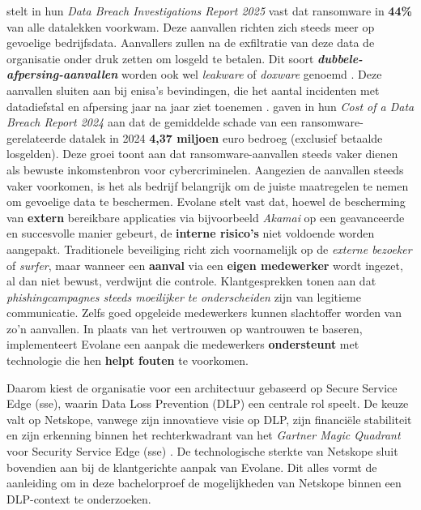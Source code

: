 \textcite{VerizonBusiness2025} stelt in hun \textit{Data Breach Investigations Report 2025} vast dat ransomware in \textbf{44\%} van alle datalekken voorkwam. 
Deze aanvallen richten zich steeds meer op gevoelige bedrijfsdata. 
Aanvallers zullen na de exfiltratie van deze data de organisatie onder druk zetten om losgeld te betalen.
Dit soort \textit\textbf{{dubbele-afpersing}-aanvallen} worden ook wel \textit{leakware} of \textit{doxware} genoemd \autocite{IBM2024}. 
Deze aanvallen sluiten aan bij \gls{enisa}'s bevindingen, die het aantal incidenten met datadiefstal en afpersing jaar na jaar ziet toenemen \autocite{EUAC2022,EUAC2023}.
\textcite{IBMSecurity2024} gaven in hun \textit{Cost of a Data Breach Report 2024} aan dat de gemiddelde schade van een ransomware-gerelateerde datalek in 2024 \textbf{4,37 miljoen} euro bedroeg (exclusief betaalde losgelden).
Deze groei toont aan dat ransomware-aanvallen steeds vaker dienen als bewuste inkomstenbron voor cybercriminelen.
Aangezien de aanvallen steeds vaker voorkomen, is het als bedrijf belangrijk om de juiste maatregelen te nemen om gevoelige data te beschermen. 
Evolane stelt vast dat, hoewel de bescherming van \textbf{extern} bereikbare applicaties via bijvoorbeeld \textit{Akamai} op een geavanceerde en succesvolle manier gebeurt,
de \textbf{interne risico's} niet voldoende worden aangepakt.
Traditionele beveiliging richt zich voornamelijk op de \textit{externe bezoeker} of \textit{surfer}, maar wanneer een \textbf{aanval} via een \textbf{eigen medewerker} wordt ingezet, al dan niet bewust, verdwijnt die controle.
Klantgesprekken tonen aan dat \textit{phishingcampagnes steeds moeilijker te onderscheiden} zijn van legitieme communicatie. 
Zelfs goed opgeleide medewerkers kunnen slachtoffer worden van zo'n aanvallen.
In plaats van het vertrouwen op wantrouwen te baseren,  implementeert Evolane een aanpak die medewerkers \textbf{ondersteunt} met technologie die hen \textbf{helpt fouten} te voorkomen. 

Daarom kiest de organisatie voor een architectuur gebaseerd op Secure Service Edge (\gls{sse}), waarin Data Loss Prevention (DLP) een centrale rol speelt.
De keuze valt op Netskope, vanwege zijn innovatieve visie op DLP, zijn financiële stabiliteit en zijn erkenning binnen het rechterkwadrant van het \textit{Gartner Magic Quadrant} voor Security Service Edge (\gls{sse}) \autocite{Gartner2024}.
De technologische sterkte van Netskope sluit bovendien aan bij de klantgerichte aanpak van Evolane. 
Dit alles vormt de aanleiding om in deze bachelorproef de mogelijkheden van Netskope binnen een DLP-context te onderzoeken.

